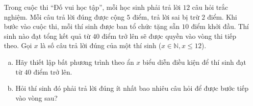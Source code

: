\begin{bt}%
Trong cuộc thi ``Đố vui học tập'', mỗi học sinh phải trả lời $12$ câu hỏi trắc nghiệm. Mỗi câu trả lời đúng được cộng $5$ điểm, trả lời sai bị trừ $2$ điểm. Khi bước vào cuộc thi, mỗi thí sinh được ban tổ chức tặng sẵn $10$ điểm khởi đầu. Thí sinh nào đạt tổng kết quả từ $40$ điểm trở lên sẽ được quyền vào vòng thi tiếp theo. Gọi $x$ là số câu trả lời đúng của một thí sinh ($x \in \mathbb{N}, x \le 12$).
\begin{enumerate}[a)]
    \item Hãy thiết lập bất phương trình theo ẩn $x$ biểu diễn điều kiện để thí sinh đạt từ $40$ điểm trở lên.
    \item Hỏi thí sinh đó phải trả lời đúng ít nhất bao nhiêu câu hỏi để được bước tiếp vào vòng sau?
\end{enumerate}
\end{bt}

